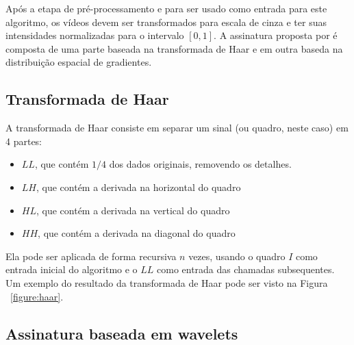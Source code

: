 Após a etapa de pré-processamento e para ser usado como entrada para este algoritmo, os vídeos devem ser transformados para escala de cinza e ter suas intensidades normalizadas para o intervalo $[0,1]$. A assinatura proposta por \citeauthor{Dutta2013} é composta de uma parte baseada na transformada de Haar e em  outra baseda na distribuição espacial de gradientes.

\subsection{Transformada de Haar}

A transformada de Haar consiste em separar um sinal (ou quadro, neste caso) em 4 partes: 

\begin{itemize}
\item $LL$, que contém $1/4$ dos dados originais, removendo os detalhes.
\item $LH$, que contém a derivada na horizontal do quadro
\item $HL$, que contém a derivada na vertical do quadro
\item $HH$, que contém a derivada na diagonal do quadro
\end{itemize}

Ela pode ser aplicada de forma recursiva $n$ vezes, usando o quadro $I$ como entrada inicial do algoritmo e o $LL$ como entrada das chamadas subsequentes. Um exemplo do resultado da transformada de Haar pode ser visto na Figura ~\ref{figure:haar}.

\subsection{Assinatura baseada em wavelets}

